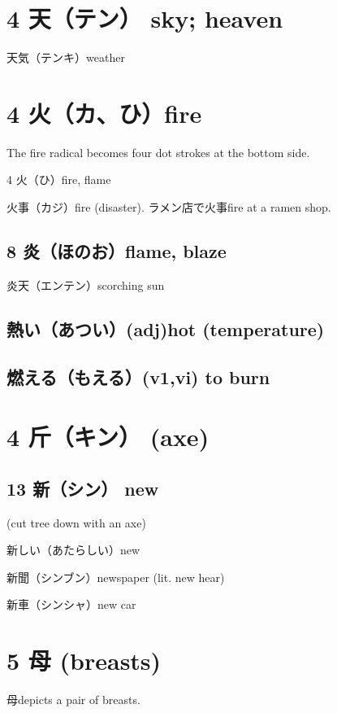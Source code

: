 \section{4 天（テン） sky; heaven}

天気（テンキ）weather

\section{4 火（カ、ひ）fire}

The fire radical becomes four dot strokes at the bottom side.

4 火（ひ）fire, flame

火事（カジ）fire (disaster).
ラメン店で火事fire at a ramen shop.

\subsection{8 炎（ほのお）flame, blaze}

炎天（エンテン）scorching sun

\subsection{熱い（あつい）(adj)hot (temperature)}

\subsection{燃える（もえる）(v1,vi) to burn}

\section{4 斤（キン） (axe)}

\subsection{13 新（シン） new}

(cut tree down with an axe)

新しい（あたらしい）new

新聞（シンブン）newspaper (lit. new hear)

新車（シンシャ）new car

\section{5 母 (breasts)}

母depicts a pair of breasts.

